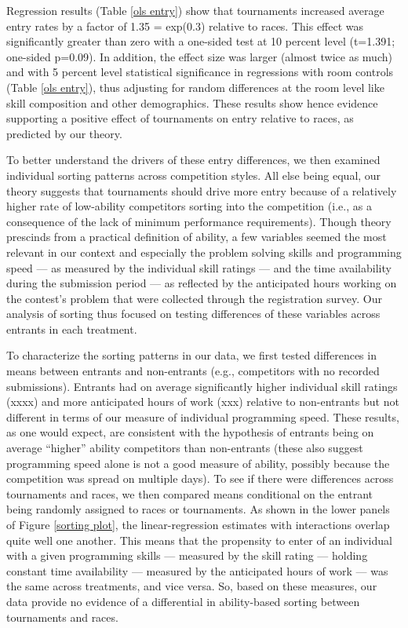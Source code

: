 \documentclass[11pt, titlepage]{article}
\begin{document}
Regression results (Table \ref{ols entry}) show that tournaments
increased average entry rates by a factor of 1.35 = exp(0.3) relative to
races. This effect was significantly greater than zero with a one-sided
test at 10 percent level (t=1.391; one-sided p=0.09). In addition, the
effect size was larger (almost twice as much) and with 5 percent level
statistical significance in regressions with room controls (Table
\ref{ols entry}), thus adjusting for random differences at the room
level like skill composition and other demographics. These results show
hence evidence supporting a positive effect of tournaments on entry
relative to races, as predicted by our theory.

To better understand the drivers of these entry differences, we then
examined individual sorting patterns across competition styles. All else
being equal, our theory suggests that tournaments should drive more
entry because of a relatively higher rate of low-ability competitors
sorting into the competition (i.e., as a consequence of the lack of
minimum performance requirements). Though theory prescinds from a
practical definition of ability, a few variables seemed the most
relevant in our context and especially the problem solving skills and
programming speed --- as measured by the individual skill ratings ---
and the time availability during the submission period --- as reflected
by the anticipated hours working on the contest's problem that were
collected through the registration survey. Our analysis of sorting thus
focused on testing differences of these variables across entrants in
each treatment.

To characterize the sorting patterns in our data, we first tested
differences in means between entrants and non-entrants (e.g.,
competitors with no recorded submissions). Entrants had on average
significantly higher individual skill ratings (xxxx) and more
anticipated hours of work (xxx) relative to non-entrants but not
different in terms of our measure of individual programming speed. These
results, as one would expect, are consistent with the hypothesis of
entrants being on average ``higher'' ability competitors than
non-entrants (these also suggest programming speed alone is not a good
measure of ability, possibly because the competition was spread on
multiple days). To see if there were differences across tournaments and
races, we then compared means conditional on the entrant being randomly
assigned to races or tournaments. As shown in the lower panels of Figure
\ref{sorting plot}, the linear-regression estimates with interactions
overlap quite well one another. This means that the propensity to enter
of an individual with a given programming skills --- measured by the
skill rating --- holding constant time availability --- measured by the
anticipated hours of work --- was the same across treatments, and vice
versa. So, based on these measures, our data provide no evidence of a
differential in ability-based sorting between tournaments and races.
\end{document}
